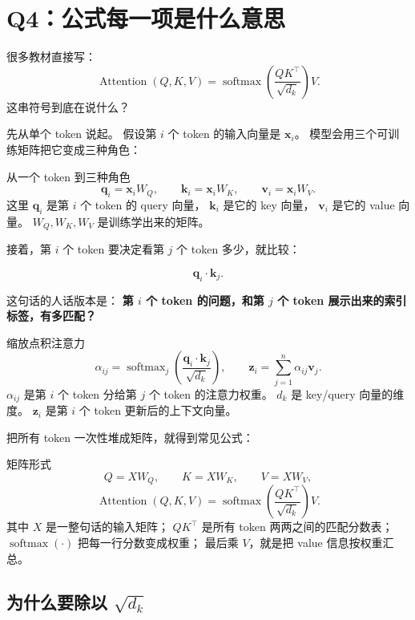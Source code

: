 \documentclass[11pt,a4paper]{ctexart}
\newcommand{\vect}[1]{\boldsymbol{#1}}
\newcommand{\softmax}{\operatorname{softmax}}
\begin{document}
\section{Q4：公式每一项是什么意思}

\begin{questionblock}
很多教材直接写：
\[
  \operatorname{Attention}(Q,K,V)
  = \softmax\!\left(\frac{QK^\top}{\sqrt{d_k}}\right)V.
\]
这串符号到底在说什么？
\end{questionblock}

先从单个 token 说起。
假设第 \(i\) 个 token 的输入向量是 \(\vect{x}_i\)。
模型会用三个可训练矩阵把它变成三种角色：

\begin{mathblock}{从一个 token 到三种角色}
\[
  \vect{q}_i = \vect{x}_i W_Q,
  \qquad
  \vect{k}_i = \vect{x}_i W_K,
  \qquad
  \vect{v}_i = \vect{x}_i W_V.
\]
这里 \(\vect{q}_i\) 是第 \(i\) 个 token 的 query 向量，
\(\vect{k}_i\) 是它的 key 向量，
\(\vect{v}_i\) 是它的 value 向量。
\(W_Q,W_K,W_V\) 是训练学出来的矩阵。
\end{mathblock}

接着，第 \(i\) 个 token 要决定看第 \(j\) 个 token 多少，就比较：

\[
  \vect{q}_i \cdot \vect{k}_j.
\]

这句话的人话版本是：
\textbf{第 \(i\) 个 token 的问题，和第 \(j\) 个 token 展示出来的索引标签，有多匹配？}

\begin{mathblock}{缩放点积注意力}
\[
  \alpha_{ij}
  =
  \softmax_j\!\left(
    \frac{\vect{q}_i \cdot \vect{k}_j}{\sqrt{d_k}}
  \right),
  \qquad
  \vect{z}_i = \sum_{j=1}^{n}\alpha_{ij}\vect{v}_j.
\]
\(\alpha_{ij}\) 是第 \(i\) 个 token 分给第 \(j\) 个 token 的注意力权重。
\(d_k\) 是 key/query 向量的维度。
\(\vect{z}_i\) 是第 \(i\) 个 token 更新后的上下文向量。
\end{mathblock}

把所有 token 一次性堆成矩阵，就得到常见公式：

\begin{mathblock}{矩阵形式}
\[
  Q=XW_Q,\qquad K=XW_K,\qquad V=XW_V,
\]
\[
  \boxed{
  \operatorname{Attention}(Q,K,V)
  =
  \softmax\!\left(\frac{QK^\top}{\sqrt{d_k}}\right)V
  }.
\]
其中 \(X\) 是一整句话的输入矩阵；
\(QK^\top\) 是所有 token 两两之间的匹配分数表；
\(\softmax(\cdot)\) 把每一行分数变成权重；
最后乘 \(V\)，就是把 value 信息按权重汇总。
\end{mathblock}

\subsection*{为什么要除以 \(\sqrt{d_k}\)}
\end{document}
